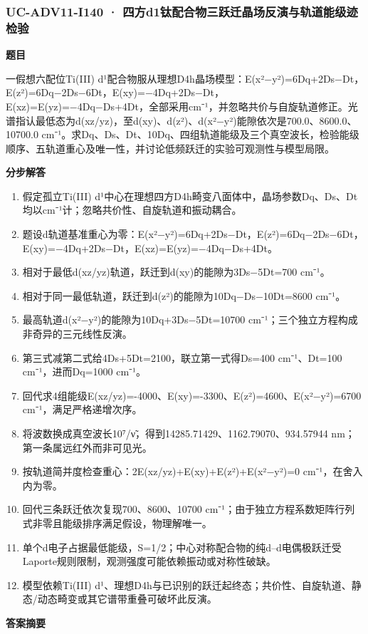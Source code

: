\documentclass[UTF8,11pt,a4paper]{ctexart}
\begin{document}
\subsubsection*{UC-ADV11-I140 · 四方d1钛配合物三跃迁晶场反演与轨道能级迹检验}
\noindent\textbf{题目}\par
一假想六配位Ti(III) d¹配合物服从理想D4h晶场模型：E(x²−y²)=6Dq+2Ds−Dt，E(z²)=6Dq−2Ds−6Dt，E(xy)=−4Dq+2Ds−Dt，E(xz)=E(yz)=−4Dq−Ds+4Dt，全部采用cm⁻¹，并忽略共价与自旋轨道修正。光谱指认最低态为d(xz/yz)，至d(xy)、d(z²)、d(x²−y²)能隙依次是700.0、8600.0、10700.0 cm⁻¹。求Dq、Ds、Dt、10Dq、四组轨道能级及三个真空波长，检验能级顺序、五轨道重心及唯一性，并讨论低频跃迁的实验可观测性与模型局限。\par
\medskip\noindent\textbf{分步解答}
\begin{enumerate}
\item 假定孤立Ti(III) d¹中心在理想四方D4h畸变八面体中，晶场参数Dq、Ds、Dt均以cm⁻¹计；忽略共价性、自旋轨道和振动耦合。
\item 题设d轨道基准重心为零：E(x²−y²)=6Dq+2Ds−Dt，E(z²)=6Dq−2Ds−6Dt，E(xy)=−4Dq+2Ds−Dt，E(xz)=E(yz)=−4Dq−Ds+4Dt。
\item 相对于最低d(xz/yz)轨道，跃迁到d(xy)的能隙为3Ds−5Dt=700 cm⁻¹。
\item 相对于同一最低轨道，跃迁到d(z²)的能隙为10Dq−Ds−10Dt=8600 cm⁻¹。
\item 最高轨道d(x²−y²)的能隙为10Dq+3Ds−5Dt=10700 cm⁻¹；三个独立方程构成非奇异的三元线性反演。
\item 第三式减第二式给4Ds+5Dt=2100，联立第一式得Ds=400 cm⁻¹、Dt=100 cm⁻¹，进而Dq=1000 cm⁻¹。
\item 回代求4组能级E(xz/yz)=-4000、E(xy)=-3300、E(z²)=4600、E(x²−y²)=6700 cm⁻¹，满足严格递增次序。
\item 将波数换成真空波长10⁷/ν̃，得到14285.71429、1162.79070、934.57944 nm；第一条属远红外而非可见光。
\item 按轨道简并度检查重心：2E(xz/yz)+E(xy)+E(z²)+E(x²−y²)=0 cm⁻¹，在舍入内为零。
\item 回代三条跃迁依次复现700、8600、10700 cm⁻¹；由于独立方程系数矩阵行列式非零且能级排序满足假设，物理解唯一。
\item 单个d电子占据最低能级，S=1/2；中心对称配合物的纯d–d电偶极跃迁受Laporte规则限制，观测强度可能依赖振动或对称性破缺。
\item 模型依赖Ti(III) d¹、理想D4h与已识别的跃迁起终态；共价性、自旋轨道、静态/动态畸变或其它谱带重叠可破坏此反演。
\end{enumerate}
\noindent\textbf{答案摘要}\par
\end{document}
